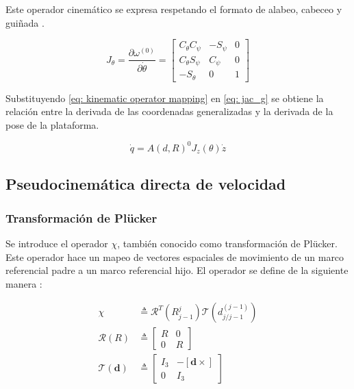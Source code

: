 Este operador cinemático se expresa respetando 
el formato de alabeo, cabeceo y guiñada 
\cite{olguin20183d}.

\begin{equation}\label{eq: kinematic operator}
 J_\theta = \dfrac{\partial \omega^{(0)}}{\partial \dot \theta}= \begin{bmatrix}
        C_\theta C_\psi & -S_\psi & 0\\
        C_\theta S_\psi & C_\psi & 0\\
        -S_\theta & 0 & 1
       \end{bmatrix}
\end{equation}

Substituyendo \eqref{eq: kinematic operator mapping}
en \eqref{eq: jac_g} se obtiene la relación entre
la derivada de las coordenadas generalizadas y 
la derivada de la pose de la plataforma.

\begin{equation} \label{eq: q_twist}
\dot{q} = A(d,R)^0J_z(\theta) \dot{z}
\end{equation}

\subsection{Pseudocinemática directa de velocidad}

\subsubsection{Transformación de Plücker}

Se introduce el operador $\chi$, 
también conocido como transformación de Plücker.
Este operador hace un mapeo de vectores 
espaciales de movimiento de un marco referencial padre a un 
marco referencial hijo.
El operador se define de la siguiente manera \cite{olguin20183d}:

\begin{subequations}
 \begin{align}
  \chi & \triangleq \mathcal R^T(R_{j-1}^j) \mathcal T(d_{j/j-1}^{(j-1)})\label{eq: chi operator}\\
  \mathcal R(R) & \triangleq \begin{bmatrix}
                              R & 0\\
                              0 & R
                             \end{bmatrix}\\
  \mathcal T(\mathbf d) & \triangleq   \begin{bmatrix}
                                        I_3 & -[\mathbf d \times]\\
                                        0 & I_3
                                       \end{bmatrix}
 \end{align}
\end{subequations}

